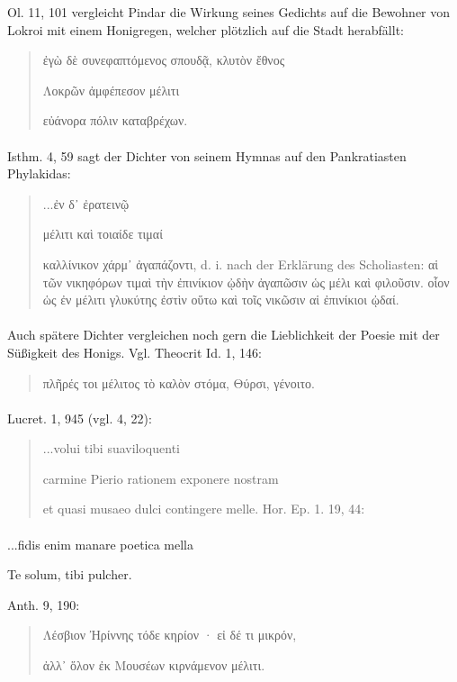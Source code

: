 \documentclass[a4paper, 11pt, oneside]{article}
\begin{document}
Ol. 11, 101 vergleicht Pindar die Wirkung seines Gedichts auf die Bewohner von Lokroi mit einem Honigregen, welcher plötzlich auf die Stadt herabfällt:
\begin{quotation}
ἐγὼ δὲ συνεφαπτόμενος σπουδᾷ, κλυτὸν ἔθνος

Λοκρῶν ἀμφέπεσον μέλιτι

εὐάνορα πόλιν καταβρέχων.
\end{quotation}
\paragraph{}
Isthm. 4, 59 sagt der Dichter von seinem Hymnas auf den Pankratiasten Phylakidas:
\begin{quotation}
...ἐν δ᾽ ἐρατεινῷ

μέλιτι καὶ τοιαίδε τιμαί

καλλίνικον χάρμ᾽ ἀγαπάζοντι, d. i. nach der Erklärung des Scholiasten: αἱ τῶν νικηφόρων τιμαὶ τὴν ἐπινίκιον ᾠδὴν ἀγαπῶσιν ὡς μέλι καὶ φιλοῦσιν. οἷον ὡς ἐν μέλιτι γλυκύτης ἐστὶν οὕτω καὶ τοῖς νικῶσιν αἱ ἐπινίκιοι ᾠδαί.
\end{quotation}
\paragraph{}
Auch spätere Dichter vergleichen noch gern die Lieblichkeit der Poesie mit der Süßigkeit des Honigs. Vgl. Theocrit Id. 1, 146:
\begin{quotation}
πλῆρές τοι μέλιτος τὸ καλὸν στόμα, Θύρσι, γένοιτο.
\end{quotation}
\paragraph{}
Lucret. 1, 945 (vgl. 4, 22):
\begin{quotation}
...volui tibi suaviloquenti

carmine Pierio rationem exponere nostram

et quasi musaeo dulci contingere melle. 
Hor. Ep. 1. 19, 44:
\end{quotation}
\paragraph{}
...fidis enim manare poetica mella

Te solum, tibi pulcher.

Anth. 9, 190:
\begin{quotation}
Λέσβιον Ἠρίννης τόδε κηρίον · εἰ δέ τι μικρόν,

ἀλλ᾽ ὅλον ἐκ Μουσέων κιρνάμενον μέλιτι.
\end{quotation}
\end{document}
